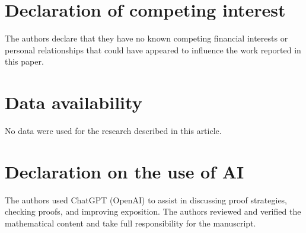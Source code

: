 \documentclass[10pt]{article}
\theoremstyle{compactplain}
\theoremstyle{remark}\newtheorem{remark}[theorem]{Remark}
\begin{document}
\section*{Declaration of competing interest}
The authors declare that they have no known competing financial interests or personal relationships that could have appeared to influence the work reported in this paper.

\section*{Data availability}
No data were used for the research described in this article.

\section*{Declaration on the use of AI}
The authors used ChatGPT (OpenAI) to assist in discussing proof strategies, checking proofs, and improving exposition. The authors reviewed and verified the mathematical content and take full responsibility for the manuscript.
\end{document}
